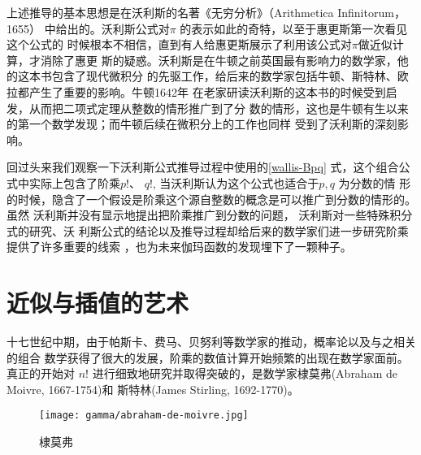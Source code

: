 上述推导的基本思想是在沃利斯的名著《无穷分析》（Arithmetica Infinitorum，1655）
中给出的。沃利斯公式对$\pi$ 的表示如此的奇特，以至于惠更斯第一次看见这个公式的
时候根本不相信，直到有人给惠更斯展示了利用该公式对$\pi$做近似计算，才消除了惠更
斯的疑惑。沃利斯是在牛顿之前英国最有影响力的数学家，他的这本书包含了现代微积分
的先驱工作，给后来的数学家包括牛顿、斯特林、欧拉都产生了重要的影响。牛顿1642年
在老家研读沃利斯的这本书的时候受到启发，从而把二项式定理从整数的情形推广到了分
数的情形，这也是牛顿有生以来的第一个数学发现；而牛顿后续在微积分上的工作也同样
受到了沃利斯的深刻影响。 

回过头来我们观察一下沃利斯公式推导过程中使用的\eqref{wallis-Bpq} 式，这个组合公
式中实际上包含了阶乘$p!$、 $q!$, 当沃利斯认为这个公式也适合于$p, q$ 为分数的情
形的时候，隐含了一个假设是阶乘这个源自整数的概念是可以推广到分数的情形的。虽然
沃利斯并没有显示地提出把阶乘推广到分数的问题， 沃利斯对一些特殊积分式的研究、沃
利斯公式的结论以及推导过程却给后来的数学家们进一步研究阶乘提供了许多重要的线索
，也为未来伽玛函数的发现埋下了一颗种子。 

\section{近似与插值的艺术}

十七世纪中期，由于帕斯卡、费马、贝努利等数学家的推动，概率论以及与之相关的组合
数学获得了很大的发展，阶乘的数值计算开始频繁的出现在数学家面前。 真正的开始对
$n!$ 进行细致地研究并取得突破的，是数学家棣莫弗(Abraham de Moivre, 1667-1754)和
斯特林(James Stirling, 1692-1770)。

\begin{figure}[htbp]
\centering
\vspace{1cm}
\texttt{[image: gamma/abraham-de-moivre.jpg]}
\caption{棣莫弗}
\end{figure}

